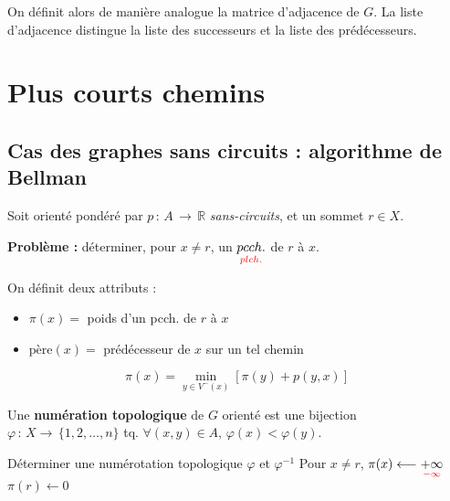 \documentclass[a4paper, 8pt]{article}
\begin{document}
\begin{multicols*}{3}
\begin{center}
\end{center}

On définit alors de manière analogue la matrice d'adjacence de $G$. La liste d'adjacence distingue la liste des successeurs et la liste des prédécesseurs. 

\section*{Plus courts chemins}

\subsection*{Cas des graphes sans circuits : algorithme de Bellman}

\newcommand{\pere}{\text{père}}
\newcommand{\Vm}{V^-}
\newcommand{\Vp}{V^+}
\newcommand{\tred}[1]{{\color{red}#1}}

Soit \GXA orienté pondéré par $p\,:\,A\,\rightarrow\,\mathbb{R}$ \emph{sans-circuits}, et un sommet $r\in X$.

\textbf{Problème :} déterminer, pour $x\neq r$, un $\underset{\tred{plch.}}{pcch.}$ de $r$ à $x$.

On définit deux attributs :
\begin{itemize}
\item $\pi(x) =$ poids d'un pcch. de $r$ à $x$
\item $\pere(x) =$ prédécesseur de $x$ sur un tel chemin
\end{itemize}

\[ \pi(x) = \displaystyle \min_{y\in \Vm(x)}\left[\pi(y) + p(y,x)\right] \]

Une \textbf{numération topologique} de $G$ orienté est une bijection $\varphi\,:\,X\rightarrow\,\{1,2,\ldots,n\}$ tq. $\forall (x,y)\in A, \,\varphi(x) < \varphi(y)$.

\begin{algorithm}[H]
 Déterminer une numérotation topologique $\varphi$ et $\varphi^{-1}$ \;
 Pour $x\neq r$, $\pi(x) \longleftarrow \underset{\tred{-\infty}}{+\infty}$\;
 $\pi(r) \longleftarrow 0$ \;
 

\end{algorithm}
\end{multicols*}
\end{document}
